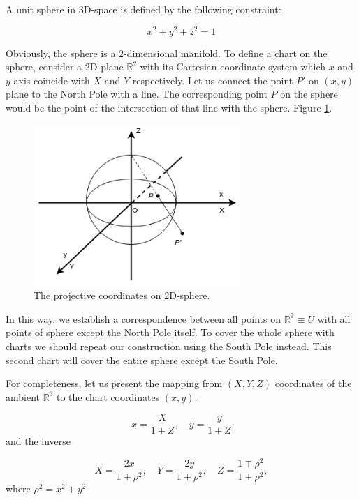\documentclass[a4paper,10pt]{article}
\begin{document}
A unit sphere in 3D-space is defined by the following constraint:

\begin{equation}
 x^2 + y^2 + z^2 = 1
\end{equation}

Obviously, the sphere is a 2-dimensional manifold. To define a chart on the sphere, consider a 2D-plane $\mathbb{R}^2$ with its Cartesian coordinate system which $x$ and $y$ axis coincide with $X$ and $Y$ respectively. Let us connect the point $P'$ on $(x,y)$ plane to the North Pole with a line. The corresponding point $P$ on the sphere would be the point of the intersection of that line with the sphere.  Figure \ref{fig:riemann}.

\begin{figure}[h]
\centering
 \includegraphics[width=0.7\textwidth]{../../images/Sphere.png}
 \caption{The projective coordinates on 2D-sphere.  }
 \label{fig:riemann}
\end{figure}

In this way, we establish a correspondence between all points on $\mathbb{R^2} \equiv U$ with all points of sphere except the North Pole itself. To cover the whole sphere with  charts we should repeat our construction using the South Pole instead. This second chart will cover the entire sphere except the South Pole. 

For completeness, let us present the mapping from $(X,Y,Z)$ coordinates of the ambient $\mathbb{R}^3$ to the chart coordinates $(x,y)$.

\begin{equation}
 x = \frac{X}{1\pm Z},\quad y = \frac{y}{1\pm Z}
\end{equation}
and the inverse 

\begin{equation}
 X = \frac{2x}{1+\rho^2},\quad Y = \frac{2y}{1+\rho^2}, \quad Z = \frac{1\mp\rho^2}{1\pm\rho^2}, 
\end{equation}
where $\rho^2 = x^2 + y^2$
\end{document}

